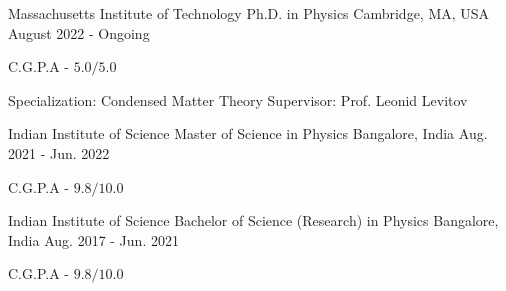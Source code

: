 

\begin{cventries}

    \cventry
	{Massachusetts Institute of Technology} %
	{Ph.D. in Physics} %
	{Cambridge, MA, USA} %
	{August 2022 - Ongoing} %
	{
	\begin{cvitems} %
		\item {C.G.P.A - $5.0/5.0$} \\
	\end{cvitems}
	Specialization: Condensed Matter Theory \linebreak
	Supervisor: Prof. Leonid Levitov
	}

    \cventry
	{Indian Institute of Science} %
	{Master of Science in Physics} %
	{Bangalore, India} %
	{Aug. 2021 - Jun. 2022} %
	{
	\begin{cvitems} %
		\item {C.G.P.A - $9.8/10.0$}
	\end{cvitems}
	}

  \cventry
    {Indian Institute of Science} %
    {Bachelor of Science (Research) in Physics} %
    {Bangalore, India} %
    {Aug. 2017 - Jun. 2021} %
    {
      \begin{cvitems} %
        \item {C.G.P.A - $9.8/10.0$}
      \end{cvitems}
    }




\end{cventries}
